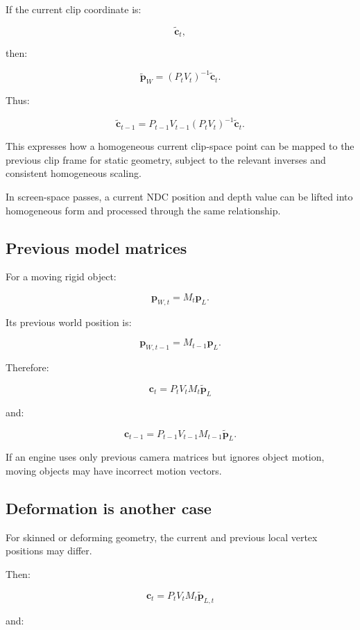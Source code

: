 If the current clip coordinate is:

\[
 \tilde{\mathbf c}_t,
\]

then:

\[
 \tilde{\mathbf p}_W = (P_tV_t)^{-1}\tilde{\mathbf c}_t.
\]

Thus:

\[
 \boxed{ \tilde{\mathbf c}_{t-1} = P_{t-1}V_{t-1} (P_tV_t)^{-1} \tilde{\mathbf c}_t }.
\]

This expresses how a homogeneous current clip-space point can be mapped to the previous clip frame for static geometry, subject to the relevant inverses and consistent homogeneous scaling.

In screen-space passes, a current NDC position and depth value can be lifted into homogeneous form and processed through the same relationship.

\subsection{Previous model matrices}\label{02-foundations-ii-ch036-previous-model-matrices}

For a moving rigid object:

\[
 \mathbf p_{W,t}=M_t\mathbf p_L.
\]

Its previous world position is:

\[
 \boxed{ \mathbf p_{W,t-1}=M_{t-1}\mathbf p_L }.
\]

Therefore:

\[
 \boxed{ \mathbf c_t=P_tV_tM_t\tilde{\mathbf p}_L }
\]

and:

\[
 \boxed{ \mathbf c_{t-1}= P_{t-1}V_{t-1}M_{t-1}\tilde{\mathbf p}_L }.
\]

If an engine uses only previous camera matrices but ignores object motion, moving objects may have incorrect motion vectors.

\subsection{Deformation is another case}\label{02-foundations-ii-ch036-deformation-is-another-case}

For skinned or deforming geometry, the current and previous local vertex positions may differ.

Then:

\[
 \boxed{ \mathbf c_t=P_tV_tM_t\tilde{\mathbf p}_{L,t} }
\]

and:

